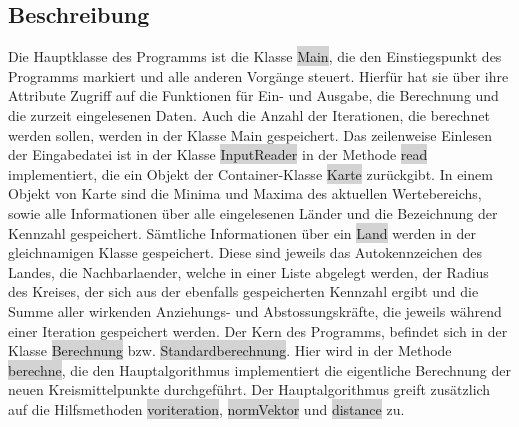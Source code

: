 \documentclass[a4paper,11pt]{article}
\begin{document}
{\subsection{Beschreibung}
Die Hauptklasse des Programms ist die Klasse \colorbox{lightgray}{Main}, die den Einstiegspunkt des Programms markiert und alle anderen Vorg\"ange steuert.
Hierf\"ur hat sie \"uber ihre Attribute Zugriff auf die Funktionen f\"ur Ein- und Ausgabe, die Berechnung und die zurzeit eingelesenen Daten. Auch die Anzahl der 
Iterationen, die berechnet werden sollen, werden in der Klasse Main gespeichert.
Das zeilenweise Einlesen der Eingabedatei ist in der Klasse \colorbox{lightgray}{InputReader} in der Methode \colorbox{lightgray}{read} implementiert, die ein Objekt der
Container-Klasse \colorbox{lightgray}{Karte} zur\"uckgibt. In einem Objekt von Karte sind die Minima und Maxima des aktuellen Wertebereichs, sowie alle Informationen \"uber alle eingelesenen L\"ander und die Bezeichnung der Kennzahl gespeichert.
S\"amtliche Informationen \"uber ein \colorbox{lightgray}{Land} werden in der gleichnamigen Klasse gespeichert. Diese sind jeweils das Autokennzeichen des Landes, die Nachbarlaender, welche in einer Liste abgelegt werden,
der Radius des Kreises, der sich aus der ebenfalls gespeicherten Kennzahl ergibt und die Summe aller wirkenden Anziehungs- und Abstossungskr\"afte, die jeweils w\"ahrend einer Iteration gespeichert werden.
Der Kern des Programms, befindet sich in der Klasse \colorbox{lightgray}{Berechnung} bzw. \colorbox{lightgray}{Standardberechnung}. Hier wird in der Methode \colorbox{lightgray}{berechne}, die den Hauptalgorithmus implementiert die \glqq eigentliche\grqq{}
Berechnung der neuen Kreismittelpunkte durchgef\"uhrt. Der Hauptalgorithmus greift zus\"atzlich auf die Hilfsmethoden \colorbox{lightgray}{voriteration}, \colorbox{lightgray}{normVektor} und \colorbox{lightgray}{distance} zu.

}
\end{document}
